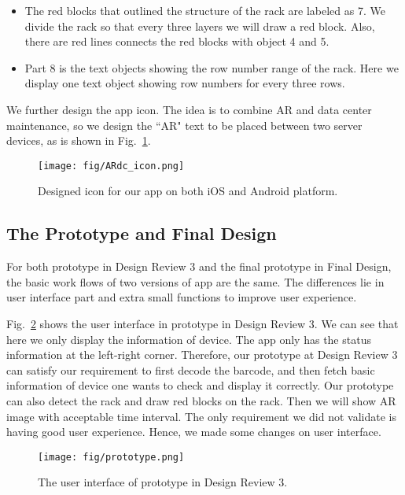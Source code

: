 \documentclass[11pt,a4paper]{article}
\begin{document}
\begin{onehalfspace}
\begin{itemize}
    \item The red blocks that outlined the structure of the rack are labeled as 7. We divide the rack so that every three layers we will draw a red block. Also, there are red lines connects the red blocks with object 4 and 5.
    \item Part 8 is the text objects showing the row number range of the rack. Here we display one text object showing row numbers for every three rows.
\end{itemize}
We further design the app icon. The idea is to combine AR and data center maintenance, so we design the ``AR" text to be placed between two server devices, as is shown in Fig.~\ref{fig:icon}.

\begin{figure}[H]
    \centering
    \texttt{[image: fig/ARdc\_icon.png]} 
    \caption{Designed icon for our app on both iOS and Android platform.}
    \label{fig:icon}
\end{figure}

\subsection{The Prototype and Final Design}
For both prototype in Design Review 3 and the final prototype in Final Design, the basic work flows of two versions of app are the same. The differences lie in user interface part and extra small functions to improve user experience.

Fig.~\ref{fig:prot} shows the user interface in prototype in Design Review 3. We can see that here we only display the information of device. The app only has the status information at the left-right corner. Therefore, our prototype at Design Review 3 can satisfy our requirement to first decode the barcode, and then fetch basic information of device one wants to check and display it correctly. Our prototype can also detect the rack and draw red blocks on the rack. Then we will show AR image with acceptable time interval. The only requirement we did not validate is having good user experience. Hence, we made some changes on user interface.

\begin{figure}[H]
    \centering
    \texttt{[image: fig/prototype.png]}
    \caption{The user interface of prototype in Design Review 3.}
    \label{fig:prot}
\end{figure}


\end{onehalfspace}
\end{document}
